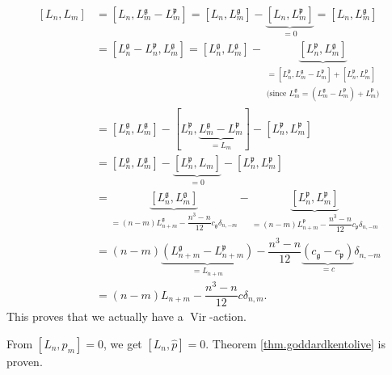 \documentclass
[numbers=enddot,12pt,final,onecolumn,german,notitlepage]{scrartcl}%
\theoremstyle{definition}
\begin{document}
\begin{align*}
\left[  L_{n},L_{m}\right]   &  =\left[  L_{n},L_{m}^{\mathfrak{g}}%
-L_{m}^{\mathfrak{p}}\right]  =\left[  L_{n},L_{m}^{\mathfrak{g}}\right]
-\underbrace{\left[  L_{n},L_{m}^{\mathfrak{p}}\right]  }_{=0}=\left[
L_{n},L_{m}^{\mathfrak{g}}\right] \\
&  =\left[  L_{n}^{\mathfrak{g}}-L_{n}^{\mathfrak{p}},L_{m}^{\mathfrak{g}%
}\right]  =\left[  L_{n}^{\mathfrak{g}},L_{m}^{\mathfrak{g}}\right]
-\underbrace{\left[  L_{n}^{\mathfrak{p}},L_{m}^{\mathfrak{g}}\right]
}_{\substack{=\left[  L_{n}^{\mathfrak{p}},L_{m}^{\mathfrak{g}}-L_{m}%
^{\mathfrak{p}}\right]  +\left[  L_{n}^{\mathfrak{p}},L_{m}^{\mathfrak{p}%
}\right]  \\\text{(since }L_{m}^{\mathfrak{g}}=\left(  L_{m}^{\mathfrak{g}%
}-L_{m}^{\mathfrak{p}}\right)  +L_{m}^{\mathfrak{p}}\text{)}}}\\
&  =\left[  L_{n}^{\mathfrak{g}},L_{m}^{\mathfrak{g}}\right]  -\left[
L_{n}^{\mathfrak{p}},\underbrace{L_{m}^{\mathfrak{g}}-L_{m}^{\mathfrak{p}}%
}_{=L_{m}}\right]  -\left[  L_{n}^{\mathfrak{p}},L_{m}^{\mathfrak{p}}\right]
\\
&  =\left[  L_{n}^{\mathfrak{g}},L_{m}^{\mathfrak{g}}\right]
-\underbrace{\left[  L_{n}^{\mathfrak{p}},L_{m}\right]  }_{=0}-\left[
L_{n}^{\mathfrak{p}},L_{m}^{\mathfrak{p}}\right] \\
&  =\underbrace{\left[  L_{n}^{\mathfrak{g}},L_{m}^{\mathfrak{g}}\right]
}_{=\left(  n-m\right)  L_{n+m}^{\mathfrak{g}}-\dfrac{n^{3}-n}{12}%
c_{\mathfrak{g}}\delta_{n,-m}}-\underbrace{\left[  L_{n}^{\mathfrak{p}}%
,L_{m}^{\mathfrak{p}}\right]  }_{=\left(  n-m\right)  L_{n+m}^{\mathfrak{p}%
}-\dfrac{n^{3}-n}{12}c_{\mathfrak{p}}\delta_{n,-m}}\\
&  =\left(  n-m\right)  \underbrace{\left(  L_{n+m}^{\mathfrak{g}}%
-L_{n+m}^{\mathfrak{p}}\right)  }_{=L_{n+m}}-\dfrac{n^{3}-n}{12}%
\underbrace{\left(  c_{\mathfrak{g}}-c_{\mathfrak{p}}\right)  }_{=c}%
\delta_{n,-m}\\
&  =\left(  n-m\right)  L_{n+m}-\dfrac{n^{3}-n}{12}c\delta_{n,m}.
\end{align*}
This proves that we actually have a $\operatorname*{Vir}$-action.

From $\left[  L_{n},p_{m}\right]  =0$, we get $\left[  L_{n},\widehat{p}%
\right]  =0$. Theorem \ref{thm.goddardkentolive} is proven.
\end{document}
